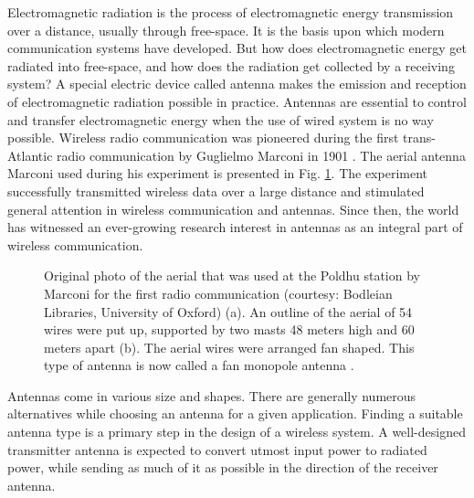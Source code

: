 Electromagnetic radiation is the process of electromagnetic energy transmission over a distance, usually through free-space. It is the basis upon which modern communication systems have developed. But how does electromagnetic energy get radiated into free-space, and how does the radiation get collected by a receiving system? A special electric device called antenna makes the emission and reception of electromagnetic radiation possible in practice. Antennas are essential to control and transfer electromagnetic energy when the use of wired system is no way possible. Wireless radio communication was pioneered during the first trans-Atlantic radio communication by Guglielmo Marconi in 1901 \cite{Ramsay1969}. The aerial antenna Marconi used during his experiment is presented in Fig. \ref{fig:Marconi}. The experiment successfully transmitted wireless data over a large distance and stimulated general attention in wireless communication and antennas. Since then, the world has witnessed an ever-growing research interest in antennas as an integral part of wireless communication.
%
\begin{figure} [thp]
\centering
\noindent
	\hspace*{\fill}%
	\mbox{}
	\hspace*{\fill}%
  \mbox{}
  	\hspace*{\fill}%
  \caption[Original photograph and outline of the first antenna used by Marconi for radio communication in 1901.]{Original photo of the aerial that was used at the Poldhu station by Marconi for the first radio communication (courtesy: Bodleian Libraries, University of Oxford) (a). An outline of the aerial of 54 wires were put up, supported by two masts 48 meters high and 60 meters apart (b). The aerial wires were arranged fan shaped. This type of antenna is now called a fan monopole antenna \cite{Ramsay1969}.}
\label{fig:Marconi}
\end{figure}

Antennas come in various size and shapes. There are generally numerous alternatives while choosing an antenna for a given application. Finding a suitable antenna type is a primary step in the design of a wireless system. A well-designed transmitter antenna is expected to convert utmost input power to radiated power, while sending as much of it as possible in the direction of the receiver antenna. %
